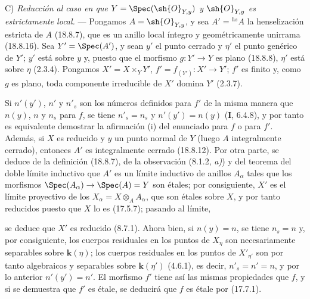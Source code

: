 C) \emph{Reducción al caso en que $Y=\Spec(\sh{O}_{Y,y})$ y $\sh{O}_{Y,y}$ es estrictamente local.} --- Pongamos $A=\sh{O}_{Y,y}$, y sea $A'={}^{hs}\!A$ la henselización estricta de $A$ (18.8.7), que es un anillo local íntegro y geométricamente unirrama (18.8.16). Sea $Y'=\Spec(A')$, y sean $y'$ el punto cerrado y $\eta'$ el punto genérico de $Y'$; $y'$ está sobre $y$ y, puesto que el morfismo $g:Y'\to Y$ es plano (18.8.8), $\eta'$ está sobre $\eta$ (2.3.4). Pongamos $X'=X\times_Y Y'$, $f'=f_{(Y')}:X'\to Y'$; $f'$ es finito y, como $g$ es plano, toda componente irreducible de $X'$ domina $Y'$ (2.3.7).

Si $n'(y')$, $n'$ y $n'_s$ son los números definidos para $f'$ de la misma manera que $n(y)$, $n$ y $n_s$ para $f$, se tiene $n'_s=n_s$ y $n'(y')=n(y)$ (\textbf I, 6.4.8), y por tanto es equivalente demostrar la afirmación (i) del enunciado para $f$ o para $f'$. Además, si $X$ es reducido y $y$ un punto normal de $Y$ (luego $A$ integralmente cerrado), entonces $A'$ es integralmente cerrado (18.8.12). Por otra parte, se deduce de la definición (18.8.7), de la observación (8.1.2, \emph{a)}) y del teorema del doble límite inductivo que $A'$ es un límite inductivo de anillos $A_\alpha$ tales que los morfismos $\Spec(A_\alpha)\to\Spec(A)=Y$ son étales; por consiguiente, $X'$ es el límite proyectivo de los $X_\alpha=X\otimes_A A_\alpha$, que son étales sobre $X$, y por tanto reducidos puesto que $X$ lo es (17.5.7); pasando al límite,


se deduce que $X'$ es reducido (8.7.1). Ahora bien, si $n(y)=n$, se tiene $n_s=n$ y, por consiguiente, los cuerpos residuales en los puntos de $X_\eta$ son necesariamente separables sobre $\boldsymbol{k}(\eta)$; los cuerpos residuales en los puntos de $X'_{\eta'}$ son por tanto algebraicos y separables sobre $\boldsymbol{k}(\eta')$ (4.6.1), es decir, $n'_s=n'=n$, y por lo anterior $n'(y')=n'$. El morfismo $f'$ tiene así las mismas propiedades que $f$, y si se demuestra que $f'$ es étale, se deducirá que $f$ es étale por (17.7.1).

